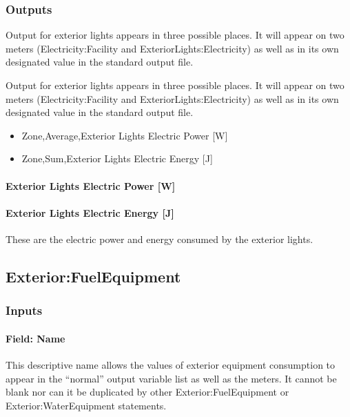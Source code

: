 \subsubsection{Outputs}\label{outputs-012}

Output for exterior lights appears in three possible places. It will appear on two meters (Electricity:Facility and ExteriorLights:Electricity) as well as in its own designated value in the standard output file.

Output for exterior lights appears in three possible places. It will appear on two meters (Electricity:Facility and ExteriorLights:Electricity) as well as in its own designated value in the standard output file.

\begin{itemize}
\item
  Zone,Average,Exterior Lights Electric Power {[}W{]}
\item
  Zone,Sum,Exterior Lights Electric Energy {[}J{]}
\end{itemize}

\paragraph{Exterior Lights Electric Power {[}W{]}}\label{exterior-lights-electric-power-w}

\paragraph{Exterior Lights Electric Energy {[}J{]}}\label{exterior-lights-electric-energy-j}

These are the electric power and energy consumed by the exterior lights.

\subsection{Exterior:FuelEquipment}\label{exteriorfuelequipment}

\subsubsection{Inputs}\label{inputs-1-015}

\paragraph{Field: Name}\label{field-name-1-014}

This descriptive name allows the values of exterior equipment consumption to appear in the ``normal'' output variable list as well as the meters. It cannot be blank nor can it be duplicated by other Exterior:FuelEquipment or Exterior:WaterEquipment statements.

